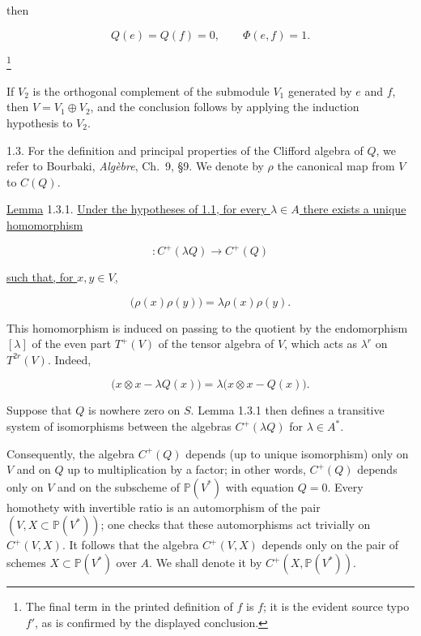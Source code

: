 then

\begin{equation*}
Q(e)=Q(f)=0,\qquad \Phi(e,f)=1.
\end{equation*}

\footnote{The final term in the printed definition of $f$ is $f$; it is
the evident source typo $f'$, as is confirmed by the displayed
conclusion.}

If $V_2$ is the orthogonal complement of the submodule $V_1$ generated
by $e$ and $f$, then $V=V_1\oplus V_2$, and the conclusion follows by
applying the induction hypothesis to $V_2$.

1.3. For the definition and principal properties of the Clifford algebra
of $Q$, we refer to Bourbaki, \emph{Algèbre}, Ch.~9, \S9.  We denote by
$\rho$ the canonical map from $V$ to $C(Q)$.

\underline{Lemma} 1.3.1. \underline{Under the hypotheses of 1.1, for
every $\lambda\in A$ there exists a unique homomorphism}

\begin{equation*}
[\lambda]\colon C^+(\lambda Q)\longrightarrow C^+(Q)
\end{equation*}

\underline{such that, for $x,y\in V$,}

\begin{equation*}
[\lambda]\bigl(\rho(x)\rho(y)\bigr)
=\lambda\rho(x)\rho(y).
\end{equation*}


This homomorphism is induced on passing to the quotient by the
endomorphism $[\lambda]$ of the even part $T^+(V)$ of the tensor algebra
of $V$, which acts as $\lambda^r$ on $T^{2r}(V)$.  Indeed,

\begin{equation*}
[\lambda]\bigl(x\otimes x-\lambda Q(x)\bigr)
=\lambda\bigl(x\otimes x-Q(x)\bigr).
\end{equation*}

Suppose that $Q$ is nowhere zero on $S$.  Lemma 1.3.1 then defines a
transitive system of isomorphisms between the algebras $C^+(\lambda Q)$
for $\lambda\in A^*$.

Consequently, the algebra $C^+(Q)$ depends (up to unique isomorphism)
only on $V$ and on $Q$ up to multiplication by a factor; in other words,
$C^+(Q)$ depends only on $V$ and on the subscheme of $\mathbb P(V^*)$
with equation $Q=0$.  Every homothety with invertible ratio is an
automorphism of the pair $(V,X\subset\mathbb P(V^*))$; one checks that
these automorphisms act trivially on $C^+(V,X)$.  It follows that the
algebra $C^+(V,X)$ depends only on the pair of schemes
$X\subset\mathbb P(V^*)$ over $A$.  We shall denote it by
$C^+(X,\mathbb P(V^*))$.
